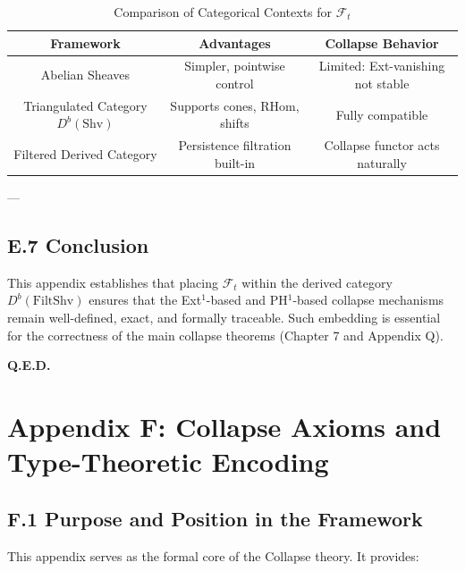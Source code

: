 \documentclass[11pt]{article}
\begin{document}
\begin{table}[h!]
\centering
\begin{tabular}{|c|c|c|}
\hline
\textbf{Framework} & \textbf{Advantages} & \textbf{Collapse Behavior} \\
\hline
Abelian Sheaves & Simpler, pointwise control & Limited: Ext-vanishing not stable \\
Triangulated Category \( D^b(\mathrm{Shv}) \) & Supports cones, RHom, shifts & Fully compatible \\
Filtered Derived Category & Persistence filtration built-in & Collapse functor acts naturally \\
\hline
\end{tabular}
\caption{Comparison of Categorical Contexts for \( \mathcal{F}_t \)}
\end{table}

---

\subsection*{E.7 Conclusion}

This appendix establishes that placing \( \mathcal{F}_t \) within the derived category \( D^b(\mathrm{FiltShv}) \)  
ensures that the Ext$^1$-based and PH$^1$-based collapse mechanisms remain well-defined, exact, and formally traceable.  
Such embedding is essential for the correctness of the main collapse theorems (Chapter 7 and Appendix Q).

\begin{flushright}
\textbf{Q.E.D.}
\end{flushright}




\section*{Appendix F: Collapse Axioms and Type-Theoretic Encoding}

\subsection*{F.1 Purpose and Position in the Framework}

This appendix serves as the formal core of the Collapse theory.  
It provides:
\end{document}
